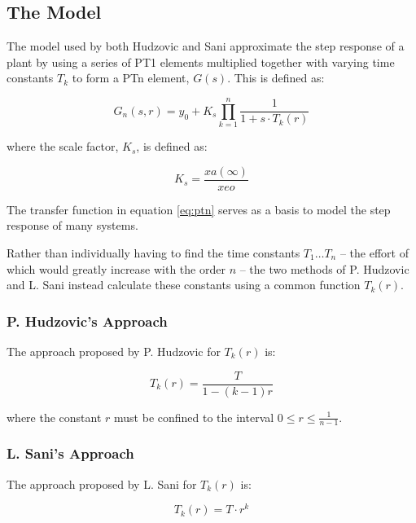 \subsection{The Model}

The  model  used  by  both  Hudzovic\cite{ref:hudzovic}  and Sani\cite{ref:sani}
approximate  the  step  response of a plant by using a series  of  PT1  elements
multiplied  together with varying time constants $T_k$ to form  a  PTn  element,
$G(s)$. This is defined as:

\begin{equation}
    G_n(s,r) = y_0 + K_s \prod_{k=1}^{n} \frac{1}{1+s \cdot T_k(r)}
    \label{eq:ptn}
\end{equation}

where the scale factor, $K_s$, is defined as:

\begin{equation}
    K_s = \frac{xa(\infty)}{xeo}
\end{equation}

The  transfer function in equation \ref{eq:ptn} serves as a basis to  model  the
step response of many systems.

Rather than individually having to find the time constants  $T_1\ldots  T_n$  --
the effort of which would greatly increase with the order $n$ -- the two methods
of  P.  Hudzovic  and  L.  Sani instead calculate these constants using a common
function $T_k(r)$.


\subsubsection*{P. Hudzovic's Approach}

The  approach  proposed  by  P.  Hudzovic\cite{ref:hudzovic}  for  $T_k(r)$  is:

\begin{equation}
    T_k(r) = \frac{T}{1 - (k-1)r}
    \label{eq:hudzovic}
\end{equation}

where  the  constant  $r$ must be  confined  to  the  interval  $0  \le  r  \leq
\frac{1}{n-1}$.


\subsubsection*{L. Sani's Approach}

The   approach   proposed   by   L.   Sani\cite{ref:sani}   for   $T_k(r)$   is:

\begin{equation}
    T_k(r) = T \cdot r^k
    \label{eq:sani}
\end{equation}

